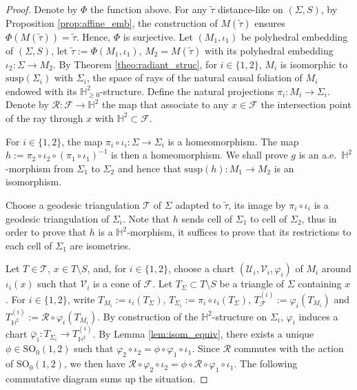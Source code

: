 \documentclass[a4paper,12pt]{article}
\def\H{\mathbb{H}}
\def\U{\mathcal U}
\def\GGL{\SO_0(1,2)}
\def\V{\mathcal V}
\def\TT{\mathcal T}
\def\R{\mathbb{R}}
\def\SO{\mathrm{SO}}
\def\susp{\mathrm{susp}}
\def\V{\mathcal V}
\def\SO{\mathrm{SO}}
\def\R{\mathcal R}
\def\Future{\mathcal F}
\def\U{\mathcal{U}}
\def\susp{\mathrm{susp}}
\theoremstyle{definition}
\begin{document}
					\begin{proof}
						Denote by $\Phi$ the function above.
						For any $\widetilde\tau$ distance-like on $(\Sigma, S)$, by Proposition \ref{prop:affine_emb}, the construction of $M(\widetilde\tau)$ ensures $\Phi(M(\widetilde\tau))=\widetilde\tau$. Hence, $\Phi$ is surjective.
						Let $(M_1,\iota_1)$ be polyhedral embedding of $(\Sigma, S)$, let $\widetilde\tau:= \Phi(M_1,\iota_1)$, $M_2 = M(\widetilde\tau)$ with its polyhedral embedding $\iota_2:\Sigma\rightarrow M_2$. 
						By Theorem \ref{theo:radiant_struc}, for $i\in \{1,2\}$, $M_i$ is isomorphic to $\susp(\Sigma_i)$ with $\Sigma_i$, the space of rays of the natural causal foliation of $M_i$ endowed with its $\H^2_{\geq0}$-structure. Define the natural projections $\pi_i:M_i\rightarrow \Sigma_i$. Denote by $\R: \Future \rightarrow \H^2$ the map that associate to any $x\in \Future$ the intersection point of the ray through $x$ with $\H^2\subset \Future$. 
						
						 For $i\in \{1,2\}$, the map $\pi_i\circ \iota_i: \Sigma\rightarrow \Sigma_i$ is a homeomorphism. The map $h:= \pi_2\circ \iota_2 \circ (\pi_1\circ \iota_1)^{-1}$ is then a homeomorphism.						
						We shall prove $g$ is an a.e.\ $\H^2$-morphism from $\Sigma_1$ to $\Sigma_2$ and hence that $\susp(h): M_1\rightarrow M_2$ is an isomorphism.
						

						Choose a geodesic triangulation $\TT$ of $\Sigma$ adapted to $\widetilde\tau$, its image by $\pi_i\circ \iota_i$ is a geodesic triangulation of $\Sigma_i$. Note that $h$ sends cell of $\Sigma_1$ to cell of $\Sigma_2$, thus in order to prove that $h$ is a $\H^2$-morphism, it suffices to prove that its restrictions to each cell of $\Sigma_1$ are isometries.
						
						
						
						
						

						Let $T\in \TT$, $x\in T\setminus S$, and, for $i\in \{1,2\}$, choose a chart $(\U_i,\V_i,\varphi_i)$ of $M_i$ around $\iota_i(x)$ such that $\V_i$ is a cone of $\Future$.
						Let $T_\Sigma\subset T\setminus S$ be a triangle of $\Sigma$ containing $x$.
						For $i\in\{1,2\}$, write $T_{M_i}:= \iota_i(T_\Sigma)$, $T_{\Sigma_i}:= \pi_i\circ \iota_i(T_\Sigma)$, $T^{(i)}_{\Future}:= \varphi_i(T_{M_i})$ and $T^{(i)}_{\H^2}:=\R\circ \varphi_i(T_{M_i})$. By construction of the $\H^2$-structure on $\Sigma_i$, $\varphi_i$ induces a chart $\overline \varphi_i: T_{\Sigma_i}\rightarrow T_{\H^2}^{(i)}$. By Lemma \ref{lem:isom_equiv}, there exists a unique $\phi\in \GGL$ such that $\varphi_2\circ \iota_2 = \phi\circ \varphi_1\circ \iota_1$. Since $\R$ commutes with the action of $\GGL$, we then have $\R\circ \varphi_2\circ \iota_2 = \phi\circ\R\circ \varphi_1\circ \iota_1$. The following commutative diagram sums up the situation.
						

\end{proof}
\end{document}
